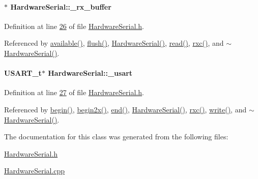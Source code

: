 \hypertarget{class_hardware_serial_a9ee5f8b61e049f98dfd0b5ae53e97273}{
\paragraph[{\_\-rx\_\-buffer}]{$\ast$ {\bf HardwareSerial::\_\-rx\_\-buffer}}\hfill}
\label{class_hardware_serial_a9ee5f8b61e049f98dfd0b5ae53e97273}


Definition at line \hyperlink{_hardware_serial_8h_source_l00026}{26} of file \hyperlink{_hardware_serial_8h_source}{HardwareSerial.h}.



Referenced by \hyperlink{_hardware_serial_8cpp_source_l00213}{available()}, \hyperlink{_hardware_serial_8cpp_source_l00230}{flush()}, \hyperlink{_hardware_serial_8cpp_source_l00112}{HardwareSerial()}, \hyperlink{_hardware_serial_8cpp_source_l00218}{read()}, \hyperlink{_hardware_serial_8cpp_source_l00094}{rxc()}, and \hyperlink{_hardware_serial_8cpp_source_l00130}{$\sim$HardwareSerial()}.

\hypertarget{class_hardware_serial_a3a3bd56aa561ae7e1eb1fd252b5b69a0}{
\paragraph[{\_\-usart}]{\setlength{\rightskip}{0pt plus 5cm}USART\_\-t$\ast$ {\bf HardwareSerial::\_\-usart}}\hfill}
\label{class_hardware_serial_a3a3bd56aa561ae7e1eb1fd252b5b69a0}


Definition at line \hyperlink{_hardware_serial_8h_source_l00027}{27} of file \hyperlink{_hardware_serial_8h_source}{HardwareSerial.h}.



Referenced by \hyperlink{_hardware_serial_8cpp_source_l00140}{begin()}, \hyperlink{_hardware_serial_8cpp_source_l00173}{begin2x()}, \hyperlink{_hardware_serial_8cpp_source_l00203}{end()}, \hyperlink{_hardware_serial_8cpp_source_l00112}{HardwareSerial()}, \hyperlink{_hardware_serial_8cpp_source_l00094}{rxc()}, \hyperlink{_hardware_serial_8cpp_source_l00240}{write()}, and \hyperlink{_hardware_serial_8cpp_source_l00130}{$\sim$HardwareSerial()}.



The documentation for this class was generated from the following files:\begin{DoxyCompactItemize}
\item 
\hyperlink{_hardware_serial_8h}{HardwareSerial.h}\item 
\hyperlink{_hardware_serial_8cpp}{HardwareSerial.cpp}\end{DoxyCompactItemize}
